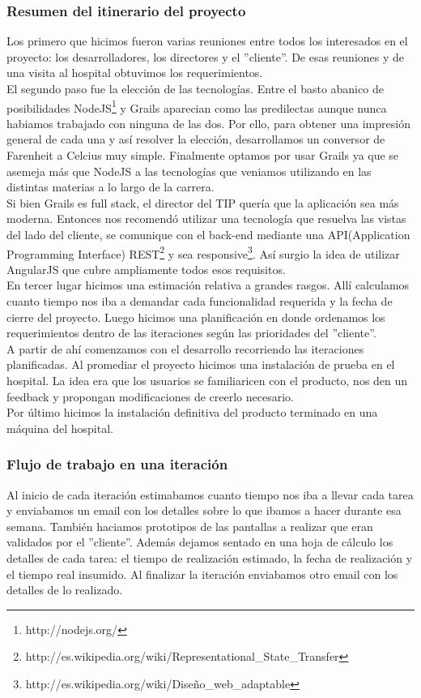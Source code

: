 \subsubsection{Resumen del itinerario del proyecto}
Los primero que hicimos fueron varias reuniones entre todos los interesados en el proyecto: los desarrolladores, los directores y el ''cliente''. De esas reuniones y de una visita al hospital obtuvimos los requerimientos.\\
El segundo paso fue la elección de las tecnologías. Entre el basto abanico de posibilidades NodeJS\footnote{http://nodejs.org/} y Grails aparecian como las predilectas aunque nunca habiamos trabajado con ninguna de las dos. Por ello, para obtener una impresión general de cada una y así resolver la elección, desarrollamos un conversor de Farenheit a Celcius muy simple. Finalmente optamos por usar Grails ya que se asemeja más que NodeJS a las tecnologías que veniamos utilizando en las distintas materias a lo largo de la carrera.\\
Si bien Grails es full stack, el director del TIP quería que la aplicación sea más moderna. Entonces nos recomendó utilizar una tecnología que resuelva las vistas del lado del cliente, se comunique con el back-end mediante una API(Application Programming Interface) REST\footnote{http://es.wikipedia.org/wiki/Representational\_State\_Transfer} 
y sea responsive\footnote{http://es.wikipedia.org/wiki/Diseño\_web\_adaptable}. Así surgio la idea de utilizar AngularJS que cubre ampliamente todos esos requisitos.\\
En tercer lugar hicimos una estimación relativa a grandes rasgos. Allí calculamos cuanto tiempo nos iba a demandar cada funcionalidad requerida y la fecha de cierre del proyecto. Luego hicimos una planificación en donde ordenamos los requerimientos dentro de las iteraciones según las prioridades del ''cliente''.\\
A partir de ahí comenzamos con el desarrollo recorriendo las iteraciones planificadas. Al promediar el proyecto hicimos una instalación de prueba en el hospital. La idea era que los usuarios se familiaricen con el producto, nos den un feedback y propongan modificaciones de creerlo necesario.\\
Por último hicimos la instalación definitiva del producto terminado en una máquina del hospital.
\subsubsection{Flujo de trabajo en una iteración}
Al inicio de cada iteración estimabamos cuanto tiempo nos iba a llevar cada tarea y enviabamos un email con los detalles sobre lo que ibamos a hacer durante esa semana. También haciamos prototipos de las pantallas a realizar que eran validados por el ''cliente''. Además dejamos sentado en una hoja de cálculo los detalles de cada tarea: el tiempo de realización estimado, la fecha de realización y el tiempo real insumido. Al finalizar la iteración enviabamos otro email con los detalles de lo realizado.
